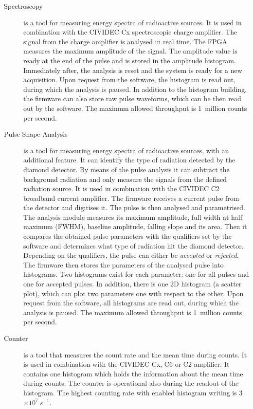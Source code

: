 \begin{description}
\item[Spectroscopy] is a tool for measuring energy spectra of radioactive sources. It is used in combination with the CIVIDEC Cx spectroscopic charge amplifier. The signal from the charge amplifier is analysed in real time. The FPGA measures the maximum amplitude of the signal. The amplitude value is ready at the end of the pulse and is stored in the amplitude histogram. Immediately after, the analysis is reset and the system is ready for a new acquisition. Upon request from the software, the histogram is read out, during which the analysis is paused. In addition to the histogram building, the firmware can also store raw pulse waveforms, which can be then read out by the software. The maximum allowed throughput is 1~million counts per second.

\item[Pulse Shape Analysis] is a tool for measuring energy spectra of radioactive sources, with an additional feature. It can identify the type of radiation detected by the diamond detector. By means of the pulse analysis it can subtract the background radiation and only measure the signals from the defined radiation source. It is used in combination with the CIVIDEC C2 broadband current amplifier. The firmware receives a current pulse from the detector and digitises it. The pulse is then analysed and parametrised. The analysis module measures its maximum amplitude, full width at half maximum (FWHM), baseline amplitude, falling slope and its area. Then it compares the obtained pulse parameters with the qualifiers set by the software and determines what type of radiation hit the diamond detector. Depending on the qualifiers, the pulse can either be \emph{accepted} or \emph{rejected}. The firmware then stores the parameters of the analysed pulse into histograms. Two histograms exist for each parameter: one for all pulses and one for accepted pulses. In addition, there is one 2D histogram (a scatter plot), which can plot two parameters one with respect to the other. Upon request from the software, all histograms are read out, during which the analysis is paused. The maximum allowed throughput is 1~million counts per second.

\item[Counter] is a tool that measures the count rate and the mean time during counts. It is used in combination with the CIVIDEC Cx, C6 or C2 amplifier. It contains one histogram which holds the information about the mean time during counts. The counter is operational also during the readout of the histogram. The highest counting rate with enabled histogram writing is 3$\times10^7~s^{-1}$.
 
\end{description}



